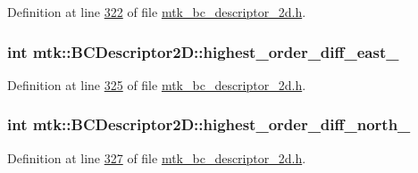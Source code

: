 Definition at line \hyperlink{mtk__bc__descriptor__2d_8h_source_l00322}{322} of file \hyperlink{mtk__bc__descriptor__2d_8h_source}{mtk\+\_\+bc\+\_\+descriptor\+\_\+2d.\+h}.

\hypertarget{classmtk_1_1BCDescriptor2D_aea5e539a10d5641bd605ebe583c14bc5}{
\subsubsection[{highest\+\_\+order\+\_\+diff\+\_\+east\+\_\+}]{\setlength{\rightskip}{0pt plus 5cm}int mtk\+::\+B\+C\+Descriptor2\+D\+::highest\+\_\+order\+\_\+diff\+\_\+east\+\_\+\hspace{0.3cm}{\ttfamily [private]}}}\label{classmtk_1_1BCDescriptor2D_aea5e539a10d5641bd605ebe583c14bc5}


Definition at line \hyperlink{mtk__bc__descriptor__2d_8h_source_l00325}{325} of file \hyperlink{mtk__bc__descriptor__2d_8h_source}{mtk\+\_\+bc\+\_\+descriptor\+\_\+2d.\+h}.

\hypertarget{classmtk_1_1BCDescriptor2D_a6cdeefe70f5bef93196f34ab2949cad2}{
\subsubsection[{highest\+\_\+order\+\_\+diff\+\_\+north\+\_\+}]{\setlength{\rightskip}{0pt plus 5cm}int mtk\+::\+B\+C\+Descriptor2\+D\+::highest\+\_\+order\+\_\+diff\+\_\+north\+\_\+\hspace{0.3cm}{\ttfamily [private]}}}\label{classmtk_1_1BCDescriptor2D_a6cdeefe70f5bef93196f34ab2949cad2}


Definition at line \hyperlink{mtk__bc__descriptor__2d_8h_source_l00327}{327} of file \hyperlink{mtk__bc__descriptor__2d_8h_source}{mtk\+\_\+bc\+\_\+descriptor\+\_\+2d.\+h}.

